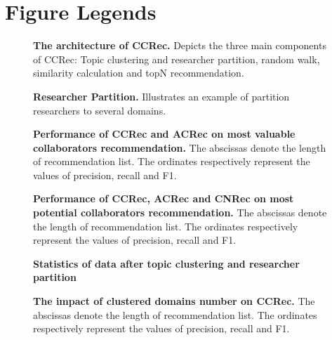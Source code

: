 \documentclass[10pt]{article}
\begin{document}
%

\section*{Figure Legends}
%

\begin{figure}[!hbt]
\caption{{\bf The architecture of CCRec.} Depicts the three main components of CCRec: Topic clustering and researcher partition, random walk, similarity calculation and topN recommendation.}
\label{Fig. 1}
\end{figure}

\begin{figure}[!hbt]
\caption{{\bf Researcher Partition.} Illustrates an example of partition researchers to several domains.}
\label{Fig. 2}
\end{figure}

\begin{figure}[!hbt]
\caption{{\bf Performance of CCRec and ACRec on most valuable collaborators recommendation.} The abscissas denote the length of recommendation list. The ordinates respectively represent the values of precision, recall and F1.}
\label{Fig. 3}
\end{figure}

\begin{figure}[!hbt]
\caption{{\bf Performance of CCRec, ACRec and CNRec on most potential collaborators recommendation.} The abscissas denote the length of recommendation list. The ordinates respectively represent the values of precision, recall and F1.}
\label{Fig. 4}
\end{figure}

\begin{figure}[!hbt]
\caption{{\bf Statistics of data after topic clustering and researcher partition}}
\label{Fig. 5}
\end{figure}

\begin{figure}[!hbt]
\caption{{\bf The impact of clustered domains number on CCRec.} The abscissas denote the length of recommendation list. The ordinates respectively represent the values of precision, recall and F1.}
\label{Fig. 6}
\end{figure}
\end{document}
